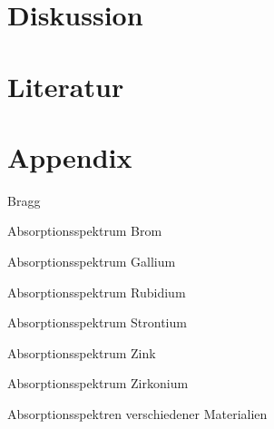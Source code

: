 \section{Diskussion}

\newpage
\section{Literatur}

\newpage
\section{Appendix}

    

    \begin{table}[H]
        \centering
        \caption{Bragg}
        
        \label{tab:2}
    \end{table}

    \begin{table}[H]
        \centering
        \caption{Absorptionsspektrum Brom}
        
        \label{tab:3}
    \end{table}
    
    \begin{table}[H]
        \centering
        \caption{Absorptionsspektrum Gallium}
        
        \label{tab:4}
    \end{table}
    
    \begin{table}[H]
    \centering
        \begin{subtable}{.49\textwidth}
        \centering
        \caption{Absorptionsspektrum Rubidium}
        
        \label{tab:5a}
        \end{subtable}    
        \begin{subtable}{.49\textwidth}
        \centering
        \caption{Absorptionsspektrum Strontium}
        
        \label{tab:5b}
        \end{subtable}
        \begin{subtable}{.49\textwidth}
        \centering
        \caption{Absorptionsspektrum Zink}
        
        \label{tab:5c}
        \end{subtable}    
        \begin{subtable}{.49\textwidth}
        \centering
        \caption{Absorptionsspektrum Zirkonium}
        
        \label{tab:5d}
        \end{subtable}
    \caption{Absorptionsspektren verschiedener Materialien}
    \label{tab:5}
    \end{table}

